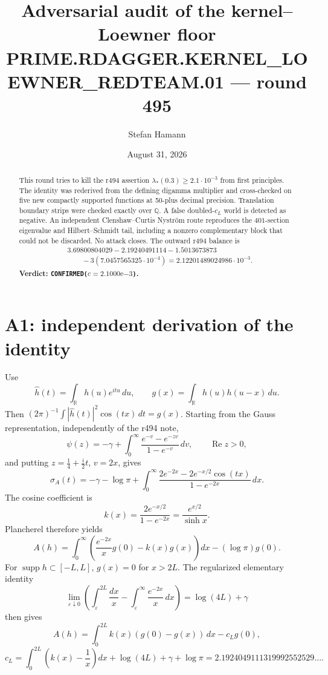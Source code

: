 \documentclass[11pt]{article}
\title{\bfseries Adversarial audit of the kernel--Loewner floor\\[2mm]
\large PRIME.RDAGGER.KERNEL\_LOEWNER\_REDTEAM.01 --- round 495}
\author{Stefan Hamann}
\date{August 31, 2026}
\theoremstyle{remark}
\begin{document}
\maketitle

\begin{abstract}\noindent
This round tries to kill the r494 assertion
$\lambda_*(0.3)\ge2.1\cdot10^{-3}$ from first principles.
The identity was rederived from the defining digamma multiplier and
cross-checked on five new compactly supported functions at 50-plus
decimal precision.  Translation boundary strips were checked exactly
over $\mathbb Q$.  A false doubled-$c_L$ world is detected as negative.
An independent Clenshaw--Curtis Nystr\"om route reproduces the
$401$-section eigenvalue and Hilbert--Schmidt tail, including a
nonzero complementary block that could not be discarded.
No attack closes.  The outward r494 balance is
\[
 \begin{split}
 &3.69800804029-2.19240491114-1.5013673873\\
 &\qquad{}-3(7.0457565325\cdot10^{-4})
 =2.12201489024986\cdot10^{-3}.
 \end{split}
\]
\textbf{Verdict: \texttt{CONFIRMED($c=2.1000\mathrm e{-3}$)}.}
\end{abstract}

\begin{center}
\end{center}

\section{A1: independent derivation of the identity}

Use
\[
 \widehat h(t)=\int_{\mathbb R}h(u)e^{itu}\,du,\qquad
 g(x)=\int_{\mathbb R}h(u)h(u-x)\,du.
\]
Then $(2\pi)^{-1}\int|\widehat h(t)|^2\cos(tx)\,dt=g(x)$.
Starting from the Gauss representation, independently of the r494
note,
\[
 \psi(z)=-\gamma+\int_0^\infty
 \frac{e^{-v}-e^{-zv}}{1-e^{-v}}\,dv,
 \qquad \operatorname{Re}z>0,
\]
and putting $z=\tfrac14+\tfrac i2t$, $v=2x$, gives
\[
 \sigma_A(t)=-\gamma-\log\pi+
 \int_0^\infty
 \frac{2e^{-2x}-2e^{-x/2}\cos(tx)}{1-e^{-2x}}\,dx.
\]
The cosine coefficient is
\[
 k(x)=\frac{2e^{-x/2}}{1-e^{-2x}}
     =\frac{e^{x/2}}{\sinh x}.
\]
Plancherel therefore yields
\[
 A(h)=\int_0^\infty
 \left(\frac{e^{-2x}}xg(0)-k(x)g(x)\right)dx
 -(\log\pi)g(0).
\]
For $\operatorname{supp}h\subset[-L,L]$, $g(x)=0$ for $x>2L$.
The regularized elementary identity
\[
 \lim_{\varepsilon\downarrow0}
 \left(\int_\varepsilon^{2L}\frac{dx}{x}
 -\int_\varepsilon^\infty\frac{e^{-2x}}x\,dx\right)
 =\log(4L)+\gamma
\]
then gives
\[
 A(h)=\int_0^{2L}k(x)(g(0)-g(x))\,dx-c_Lg(0),
\]
\[
 c_L=\int_0^{2L}\left(k(x)-\frac1x\right)dx
 +\log(4L)+\gamma+\log\pi
 =2.1924049111319992552529\ldots .
\]
\end{document}
